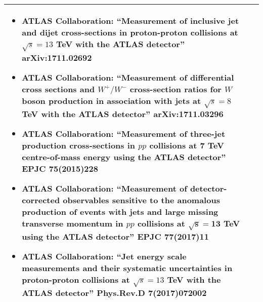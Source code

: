 \begin{center}
{\begin{tabular}{@{}p{25mm}|p{190mm}@{}}
{\vspace{-3mm}
\begin{itemize}%
\item   ATLAS Collaboration: ``Measurement of inclusive jet and dijet cross-sections in proton-proton collisions at $\sqrt{s}=13$ TeV with the ATLAS detector'' arXiv:1711.02692
\item  ATLAS Collaboration: ``Measurement of differential cross sections and $W^+/W^-$  cross-section ratios for $W$ boson production in association with jets at $\sqrt{s}=8$ TeV with the ATLAS detector'' arXiv:1711.03296
\item   ATLAS Collaboration: ``Measurement of three-jet production cross-sections in $pp$ collisions at 7 TeV centre-of-mass energy using the ATLAS detector'' EPJC 75(2015)228
\item   ATLAS Collaboration: ``Measurement of detector-corrected observables sensitive to the anomalous production of events with jets and large missing transverse momentum in $pp$ collisions at $\mathbf{\sqrt{s}=13}$  TeV using the ATLAS detector'' EPJC 77(2017)11
\item   ATLAS Collaboration: ``Jet energy scale measurements and their systematic uncertainties in proton-proton collisions at $\sqrt{s} = 13$ TeV with the ATLAS detector'' Phys.Rev.D 7(2017)072002
\end{itemize}}\tabularnewline\bottomrule
\end{tabular}
}%
\end{center}

